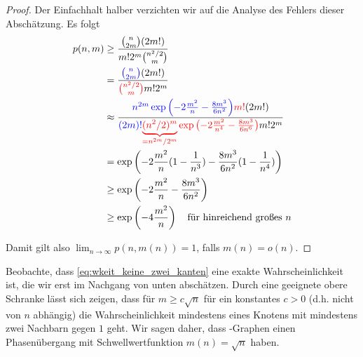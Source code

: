 \begin{proof}
    Der Einfachhalt halber verzichten wir auf die Analyse des Fehlers dieser Abschätzung.
    Es folgt
    \begin{align}
        p(n, m)
         & \ge \frac{\binom{n}{2m} (2m!)}{m! 2^m \binom{n^2/2}{m}}                                                                                   \\
         & = \frac{\textcolor{blue}{\binom{n}{2m}}(2m!)}{\textcolor{red}{\binom{n^2/2}{m}} m! 2^m}                                                   \\
         & \approx \frac{
        \textcolor{blue}{n^{2m} \exp\left(-2\frac{m^2}{n} - \frac{8m^3}{6n^2}\right)}\textcolor{red}{m!}(2m!)
        }{
        \textcolor{blue}{(2m)!}\textcolor{red}{\underbrace{(n^2/2)^m}_{=n^{2m} / 2^m} \exp\left(-2\frac{m^2}{n^4} - \frac{8m^3}{6n^6}\right)} m!2^m} \\
         & = \exp\left(-2\frac{m^2}{n} (1 - \frac{1}{n^3}) - \frac{8m^3}{6n^2} (1 - \frac{1}{n^4}) \right)                                           \\
         & \ge \exp\left(-2\frac{m^2}{n} - \frac{8m^3}{6n^2} \right)                                                                                 \\
         & \ge \exp\left(-4\frac{m^2}{n} \right) \quad \text{für hinreichend großes $n$}
    \end{align}

    Damit gilt also $\lim_{n \to \infty} p(n, m(n)) = 1$, falls $m(n) = o(n)$.
\end{proof}

Beobachte, dass \cref{eq:wkeit_keine_zwei_kanten} eine exakte Wahrscheinlichkeit ist, die wir erst im Nachgang von unten abschätzen.
Durch eine geeignete obere Schranke lässt sich zeigen, dass für $m \ge c \sqrt n$ für ein konstantes $c > 0$ (d.h. nicht von $n$ abhängig) die Wahrscheinlichkeit mindestens eines Knotens mit mindestens zwei Nachbarn gegen $1$ geht.
Wir sagen daher, dass \Gnm-Graphen einen Phasenübergang mit Schwellwertfunktion $m(n) = \sqrt n$ haben.


\bigskip

